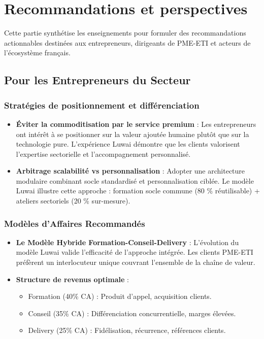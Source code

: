 \chapter{Recommandations et perspectives}
\label{chap:recommendations}

Cette partie synthétise les enseignements pour formuler des recommandations actionnables destinées aux entrepreneurs, dirigeants de PME-ETI et acteurs de l'écosystème français.

\section{Pour les Entrepreneurs du Secteur}

\subsection{Stratégies de positionnement et différenciation}

\begin{itemize}
    \item \textbf{Éviter la commoditisation par le service premium} : Les entrepreneurs ont intérêt à se positionner sur la valeur ajoutée humaine plutôt que sur la technologie pure. L'expérience Luwai démontre que les clients valorisent l'expertise sectorielle et l'accompagnement personnalisé.
    \item \textbf{Arbitrage scalabilité vs personnalisation} : Adopter une architecture modulaire combinant socle standardisé et personnalisation ciblée. Le modèle Luwai illustre cette approche : formation socle commune (80 \% réutilisable) + ateliers sectoriels (20 \% sur-mesure).
\end{itemize}

\subsection{Modèles d'Affaires Recommandés}

\begin{itemize}
    \item \textbf{Le Modèle Hybride Formation-Conseil-Delivery} : L'évolution du modèle Luwai valide l'efficacité de l'approche intégrée. Les clients PME-ETI préfèrent un interlocuteur unique couvrant l'ensemble de la chaîne de valeur.
    \item \textbf{Structure de revenus optimale} :
    \begin{itemize}
        \item Formation (40\% CA) : Produit d'appel, acquisition clients.
        \item Conseil (35\% CA) : Différenciation concurrentielle, marges élevées.
        \item Delivery (25\% CA) : Fidélisation, récurrence, références clients.
    \end{itemize}
\end{itemize}

